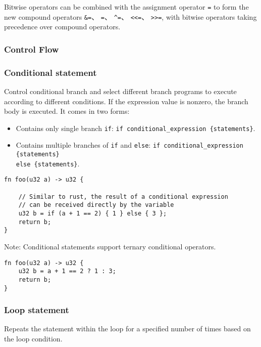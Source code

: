Bitwise operators can be combined with the assignment operator \texttt{=} to form the new compound operators \texttt{\&=}、 \texttt{\textbar=}、 \texttt{\textasciicircum=}、 \texttt{<<=}、 \texttt{>>=}, 
with bitwise operators taking precedence over compound operators.

\subsubsection{Control Flow}

\subsubsection*{Conditional statement}

Control conditional branch and select different branch programs to execute according to different conditions. 
If the expression value is nonzero, the branch body is executed.
It comes in two forms:

\begin{itemize}
    \item Contains only single branch \verb|if|: \verb|if conditional_expression {statements}|.
    \item Contains multiple branches of \verb|if| and \verb|else|: 
    \verb|if conditional_expression {statements}| \\
    \verb|else {statements}|.

\end{itemize}

\begin{lstlisting}
fn foo(u32 a) -> u32 {
    
    // Similar to rust, the result of a conditional expression 
    // can be received directly by the variable
    u32 b = if (a + 1 == 2) { 1 } else { 3 };
    return b;
}
\end{lstlisting}

Note: Conditional statements support ternary conditional operators.

\begin{lstlisting}
fn foo(u32 a) -> u32 {
    u32 b = a + 1 == 2 ? 1 : 3;
    return b;
}
\end{lstlisting}

\subsubsection*{Loop statement}

Repeats the statement within the loop for a specified number of times based on the loop condition.

